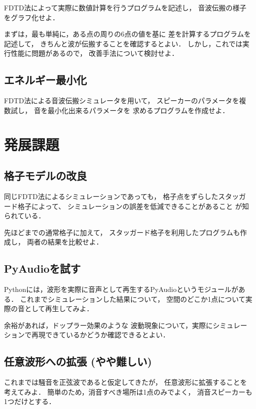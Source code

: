 FDTD法によって実際に数値計算を行うプログラムを記述し，
音波伝搬の様子をグラフ化せよ．

まずは，最も単純に，ある点の周りの6点の値を基に
差を計算するプログラムを記述して，
きちんと波が伝搬することを確認するとよい．
しかし，これでは実行性能に問題があるので，
改善手法について検討せよ．

\subsection{エネルギー最小化}

FDTD法による音波伝搬シミュレータを用いて，
スピーカーのパラメータを複数試し，
音を最小化出来るパラメータを
求めるプログラムを作成せよ．

\section{発展課題}

\subsection{格子モデルの改良}

同じFDTD法によるシミュレーションであっても，
格子点をずらしたスタッガード格子によって、
シミュレーションの誤差を低減できることがあること
が知られている．

先ほどまでの通常格子に加えて，
スタッガード格子を利用したプログラムも作成し，
両者の結果を比較せよ．

\subsection{PyAudioを試す}

Pythonには，波形を実際に音声として再生するPyAudioというモジュールがある．
これまでシミュレーションした結果について，
空間のどこか1点について実際の音として再生してみよ．

余裕があれば，ドップラー効果のような
波動現象について，実際にシミュレーションで再現できているかどうか確認できるとよい．


\subsection{任意波形への拡張 (やや難しい)}

これまでは騒音を正弦波であると仮定してきたが，
任意波形に拡張することを考えてみよ．
簡単のため，消音すべき場所は1点のみでよく，
消音スピーカーも1つだけとする．


